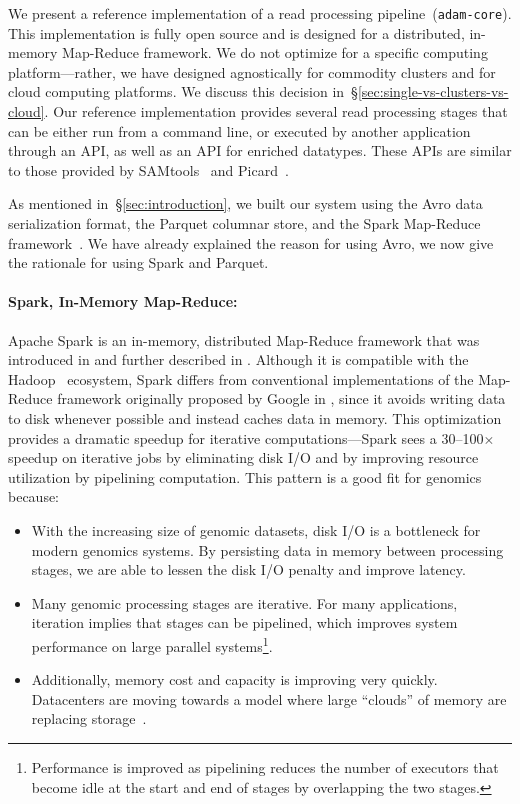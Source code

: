 \documentclass{bioinfo}
\begin{document}
We present a reference implementation of a read processing pipeline~(\texttt{adam-core}). This implementation is fully open source
and is designed for a distributed, in-memory Map-Reduce framework. We do not optimize for a specific computing platform---rather, we have designed
agnostically for commodity clusters and for cloud computing platforms. We discuss this decision in~\S\ref{sec:single-vs-clusters-vs-cloud}. Our reference
implementation provides several read processing stages that can be either run from a command line, or executed by another application through
an API, as well as an API for enriched datatypes. These APIs are similar to those provided by SAMtools~\citep{li09} and Picard~\citep{picard}.

As mentioned in~\S\ref{sec:introduction}, we built our system using the Avro data serialization format, the Parquet columnar store, and the Spark Map-Reduce
framework~\citep{avro, parquet, zaharia10}. We have already explained the reason for using Avro, we now give the rationale for using Spark and Parquet.

\paragraph{Spark, In-Memory Map-Reduce:}
\label{sec:spark}

Apache Spark is an in-memory, distributed Map-Reduce framework that was introduced in \citet{zaharia10} and further described in \citet{zaharia12}.
Although it is compatible with the Hadoop~\citep{hadoop} ecosystem, Spark differs from conventional implementations of the Map-Reduce framework
originally proposed by Google in \citet{dean08}, since it avoids writing data to disk whenever possible and instead caches
data in memory. This optimization provides a dramatic speedup for iterative computations---Spark sees a 30--100$\times$ speedup on iterative jobs by eliminating
disk I/O and by improving resource utilization by pipelining computation. This pattern is a good fit for genomics because:

\begin{itemize}
\item With the increasing size of genomic datasets, disk I/O is a bottleneck for modern genomics systems. By persisting data in memory between processing stages,
we are able to lessen the disk I/O penalty and improve latency.
\item Many genomic processing stages are iterative. For many applications, iteration implies that stages can be pipelined, which improves system performance on large
parallel systems\footnote{Performance is improved as pipelining reduces the number of executors that become idle at the start and end of stages by overlapping the
two stages.}.
\item Additionally, memory cost and capacity is improving very quickly. Datacenters are moving towards a model where large ``clouds'' of memory are replacing
storage~\citep{barroso13}.
\end{itemize}
\end{document}
